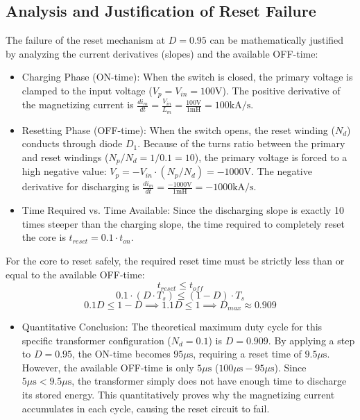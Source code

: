 \documentclass{article}
\begin{document}
\subsection{Analysis and Justification of Reset Failure}
The failure of the reset mechanism at $D = 0.95$ can be mathematically justified by analyzing the current derivatives (slopes) and the available OFF-time:
\begin{itemize}
    \item Charging Phase (ON-time): When the switch is closed, the primary voltage is clamped to the input voltage ($V_p = V_{in} = 100\text{V}$). The positive derivative of the magnetizing current is $\frac{di_m}{dt} = \frac{V_{in}}{L_m} = \frac{100\text{V}}{1\text{mH}} = 100\text{kA/s}$.
\end{itemize}
\begin{itemize}
    \item Resetting Phase (OFF-time): When the switch opens, the reset winding ($N_d$) conducts through diode $D_1$. Because of the turns ratio between the primary and reset windings ($N_p/N_d = 1/0.1 = 10$), the primary voltage is forced to a high negative value: $V_p = -V_{in} \cdot (N_p/N_d) = -1000\text{V}$. The negative derivative for discharging is $\frac{di_m}{dt} = \frac{-1000\text{V}}{1\text{mH}} = -1000\text{kA/s}$.
\end{itemize}
\begin{itemize}
    \item Time Required vs. Time Available: Since the discharging slope is exactly 10 times steeper than the charging slope, the time required to completely reset the core is $t_{reset} = 0.1 \cdot t_{on}$.
\end{itemize}
For the core to reset safely, the required reset time must be strictly less than or equal to the available OFF-time:
$$t_{reset} \le t_{off}$$
$$0.1 \cdot (D \cdot T_s) \le (1 - D) \cdot T_s$$
$$0.1 D \le 1 - D \implies 1.1 D \le 1 \implies D_{max} \approx 0.909$$
\begin{itemize}
    \item Quantitative Conclusion: The theoretical maximum duty cycle for this specific transformer configuration ($N_d = 0.1$) is $D = 0.909$. By applying a step to $D = 0.95$, the ON-time becomes $95\mu\text{s}$, requiring a reset time of $9.5\mu\text{s}$. However, the available OFF-time is only $5\mu\text{s}$ ($100\mu\text{s} - 95\mu\text{s}$). Since $5\mu\text{s} < 9.5\mu\text{s}$, the transformer simply does not have enough time to discharge its stored energy. This quantitatively proves why the magnetizing current accumulates in each cycle, causing the reset circuit to fail.
\end{itemize}
\end{document}
